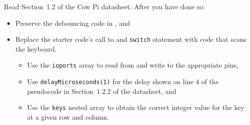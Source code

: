 Read Section~1.2 of the Cow Pi datasheet.
After you have done so:

\begin{itemize}
    \item Preserve the debouncing code in , and
    \item Replace the starter code's call to  and \lstinline{switch} statement with code that scans the keyboard.
        \begin{itemize}
            \item Use the \lstinline{ioports} array to read from and write to the appropriate pins,
            \item Use \lstinline{delayMicroseconds(1)} for the delay shown on line 4 of the pseudocode in Section~1.2.2 of the datasheet, and
            \item Use the \lstinline{keys} nested array to obtain the correct integer value for the key at a given row and column.
        \end{itemize}
\end{itemize}

